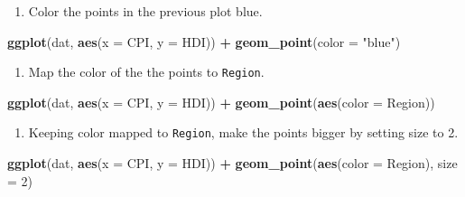 \documentclass[]{book}
\newenvironment{Shaded}{\begin{snugshade}}{\end{snugshade}}
\newcommand{\KeywordTok}[1]{\textcolor[rgb]{0.13,0.29,0.53}{\textbf{#1}}}
\newcommand{\DataTypeTok}[1]{\textcolor[rgb]{0.13,0.29,0.53}{#1}}
\newcommand{\DecValTok}[1]{\textcolor[rgb]{0.00,0.00,0.81}{#1}}
\newcommand{\StringTok}[1]{\textcolor[rgb]{0.31,0.60,0.02}{#1}}
\newcommand{\OperatorTok}[1]{\textcolor[rgb]{0.81,0.36,0.00}{\textbf{#1}}}
\newcommand{\NormalTok}[1]{#1}
\providecommand{\tightlist}{%
  \setlength{\itemsep}{0pt}\setlength{\parskip}{0pt}}
\begin{document}
\begin{enumerate}
\def\labelenumi{\arabic{enumi}.}
\setcounter{enumi}{1}
\tightlist
\item
  Color the points in the previous plot blue.
\end{enumerate}

\begin{Shaded}
\begin{Highlighting}[]
\KeywordTok{ggplot}\NormalTok{(dat, }\KeywordTok{aes}\NormalTok{(}\DataTypeTok{x =}\NormalTok{ CPI, }\DataTypeTok{y =}\NormalTok{ HDI)) }\OperatorTok{+}
\StringTok{  }\KeywordTok{geom_point}\NormalTok{(}\DataTypeTok{color =} \StringTok{"blue"}\NormalTok{)}
\end{Highlighting}
\end{Shaded}

\begin{enumerate}
\def\labelenumi{\arabic{enumi}.}
\setcounter{enumi}{2}
\tightlist
\item
  Map the color of the the points to \texttt{Region}.
\end{enumerate}

\begin{Shaded}
\begin{Highlighting}[]
\KeywordTok{ggplot}\NormalTok{(dat, }\KeywordTok{aes}\NormalTok{(}\DataTypeTok{x =}\NormalTok{ CPI, }\DataTypeTok{y =}\NormalTok{ HDI)) }\OperatorTok{+}
\StringTok{  }\KeywordTok{geom_point}\NormalTok{(}\KeywordTok{aes}\NormalTok{(}\DataTypeTok{color =}\NormalTok{ Region))}
\end{Highlighting}
\end{Shaded}

\begin{enumerate}
\def\labelenumi{\arabic{enumi}.}
\setcounter{enumi}{3}
\tightlist
\item
  Keeping color mapped to \texttt{Region}, make the points bigger by
  setting size to 2.
\end{enumerate}

\begin{Shaded}
\begin{Highlighting}[]
\KeywordTok{ggplot}\NormalTok{(dat, }\KeywordTok{aes}\NormalTok{(}\DataTypeTok{x =}\NormalTok{ CPI, }\DataTypeTok{y =}\NormalTok{ HDI)) }\OperatorTok{+}
\StringTok{  }\KeywordTok{geom_point}\NormalTok{(}\KeywordTok{aes}\NormalTok{(}\DataTypeTok{color =}\NormalTok{ Region), }\DataTypeTok{size =} \DecValTok{2}\NormalTok{)}
\end{Highlighting}
\end{Shaded}
\end{document}
